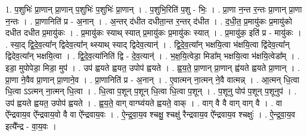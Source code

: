 \documentclass[17pt]{extarticle}
\begin{document}
1. प॒शुभिः॑ प्रा॒णान् प्रा॒णान् प॒शुभिः॑ प॒शुभिः॑ प्रा॒णान् । . प॒शुभि॒रिति॑ प॒शु - भिः॒ । . प्रा॒णा न॒न्त र॒न्तः प्रा॒णान् प्रा॒णा न॒न्तः । . प्रा॒णानिति॑ प्र - अ॒नान् । . अ॒न्तर् द॑धीत दधीता॒न्त र॒न्तर् द॑धीत । . द॒धी॒त॒ प्र॒मायु॑कः प्र॒मायु॑को दधीत दधीत प्र॒मायु॑कः । . प्र॒मायु॑कः स्याथ् स्यात् प्र॒मायु॑कः प्र॒मायु॑कः स्यात् । . प्र॒मायु॑क॒ इति॑ प्र - मायु॑कः । . स्या॒द् द्वि॒दे॒व॒त्या᳚न् द्विदेव॒त्या᳚न् थ्स्याथ् स्याद् द्विदेव॒त्यान्॑ । . द्वि॒दे॒व॒त्या᳚न् भक्षयि॒त्वा भ॑क्षयि॒त्वा द्वि॑देव॒त्या᳚न् द्विदेव॒त्या᳚न् भक्षयि॒त्वा । . द्वि॒दे॒व॒त्या॑निति॑ द्वि - दे॒व॒त्यान्॑ । . भ॒क्ष॒यि॒त्वेडा॒ मिडा᳚म् भक्षयि॒त्वा भ॑क्षयि॒त्वेडा᳚म् । . इडा॒ मुपोपेडा॒ मिडा॒ मुप॑ । . उप॑ ह्वयते ह्वयत॒ उपोप॑ ह्वयते । . ह्व॒य॒ते॒ प्रा॒णान् प्रा॒णान् ह्व॑यते ह्वयते प्रा॒णान् । . प्रा॒णा ने॒वैव प्रा॒णान् प्रा॒णाने॒व । . प्रा॒णानिति॑ प्र - अ॒नान् । . ए॒वात्मन् ना॒त्मन् ने॒वै वात्मन्न् । . आ॒त्मन् धि॒त्वा धि॒त्वा ऽऽत्मन् ना॒त्मन् धि॒त्वा । . धि॒त्वा प॒शून् प॒शून् धि॒त्वा धि॒त्वा प॒शून् । . प॒शूनु पोप॑ प॒शून् प॒शूनुप॑ । . उप॑ ह्वयते ह्वयत॒ उपोप॑ ह्वयते । . ह्व॒य॒ते॒ वाग् वाग्घ्व॑यते ह्वयते॒ वाक् । . वाग् वै वै वाग् वाग् वै । . वा ऐ᳚न्द्रवाय॒व ऐ᳚न्द्रवाय॒वो वै वा ऐ᳚न्द्रवाय॒वः । . ऐ॒न्द्र॒वा॒य॒व श्चक्षु॒ श्चक्षु॑ रैन्द्रवाय॒व ऐ᳚न्द्रवाय॒व श्चक्षुः॑ । . ऐ॒न्द्र॒वा॒य॒व इत्यै᳚न्द्र - वा॒य॒वः । \newline
\end{document}
